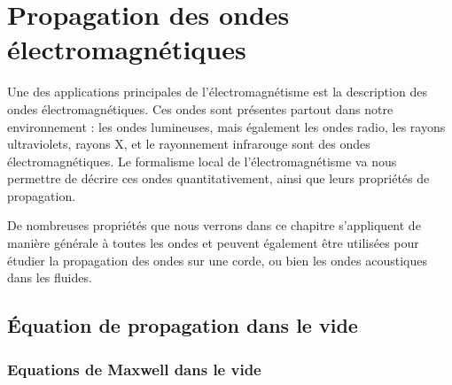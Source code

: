 \documentclass[11pt,fleqn]{book} %
\begin{document}










\setcounter{chapter}{16}

\chapter{Propagation des ondes électromagnétiques}

Une des applications principales de l'électromagnétisme est la description des ondes électromagnétiques. Ces ondes sont présentes partout dans notre environnement : les ondes lumineuses, mais également les ondes radio, les rayons ultraviolets, rayons X, et le rayonnement infrarouge sont des ondes électromagnétiques. Le formalisme local de l'électromagnétisme va nous permettre de décrire ces ondes quantitativement, ainsi que leurs propriétés de propagation.

De nombreuses propriétés que nous verrons dans ce chapitre s'appliquent de manière générale à toutes les ondes et peuvent également être utilisées pour étudier la propagation des ondes sur une corde, ou bien les ondes acoustiques dans les fluides.

\section{\'{E}quation de propagation dans le vide}

\subsection{Equations de Maxwell dans le vide}
\end{document}
